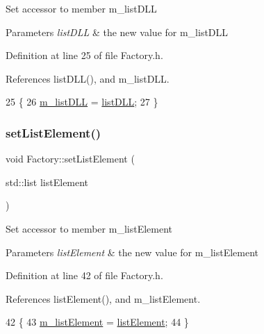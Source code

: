 Set accessor to member m\+\_\+list\+D\+LL 
\begin{DoxyParams}{Parameters}
{\em list\+D\+LL} & the new value for m\+\_\+list\+D\+LL \\
\hline
\end{DoxyParams}


Definition at line 25 of file Factory.\+h.



References list\+D\+L\+L(), and m\+\_\+list\+D\+LL.


\begin{DoxyCode}
25                                       \{
26     \hyperlink{classFactory_a266167ae49fcf4fa9baa5485dea4b062}{m\_listDLL} = \hyperlink{classFactory_a21cd37e4b21b06e574cf67faea08782a}{listDLL};
27   \}
\end{DoxyCode}
\mbox{\label{classFactory_a7bc368f81d0228931a44b41b27c39b53}} 
\subsubsection{\texorpdfstring{set\+List\+Element()}{setListElement()}}
{\footnotesize\ttfamily void Factory\+::set\+List\+Element (\begin{DoxyParamCaption}\item[{std\+::list}]{list\+Element }\end{DoxyParamCaption})\hspace{0.3cm}{\ttfamily [inline]}}

Set accessor to member m\+\_\+list\+Element 
\begin{DoxyParams}{Parameters}
{\em list\+Element} & the new value for m\+\_\+list\+Element \\
\hline
\end{DoxyParams}


Definition at line 42 of file Factory.\+h.



References list\+Element(), and m\+\_\+list\+Element.


\begin{DoxyCode}
42                                             \{
43     \hyperlink{classFactory_a83a99d80105fab2371ce03230b90e8a3}{m\_listElement} = \hyperlink{classFactory_aca9a1442c4ee2f17ea27db723ce65d90}{listElement};
44   \}
\end{DoxyCode}
\mbox{\label{classFactory_afdec7fe6e79da3e5748d33f740333671}} 
